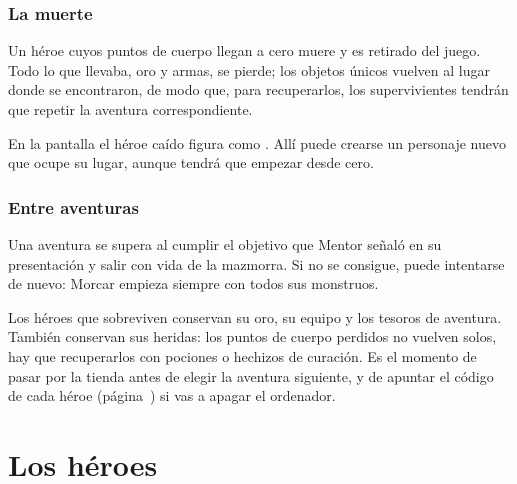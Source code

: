 \subsection{La muerte}

Un héroe cuyos puntos de cuerpo llegan a cero muere y es retirado del
juego. Todo lo que llevaba, oro y armas, se pierde; los objetos únicos
vuelven al lugar donde se encontraron, de modo que, para recuperarlos, los
supervivientes tendrán que repetir la aventura correspondiente.

En la pantalla  el héroe caído figura como
. Allí puede crearse un personaje nuevo que ocupe su lugar,
aunque tendrá que empezar desde cero.

\subsection{Entre aventuras}

Una aventura se supera al cumplir el objetivo que Mentor señaló en su
presentación y salir con vida de la mazmorra. Si no se consigue, puede
intentarse de nuevo: Morcar empieza siempre con todos sus monstruos.

Los héroes que sobreviven conservan su oro, su equipo y los tesoros de
aventura. También conservan sus heridas: los puntos de cuerpo perdidos no
vuelven solos, hay que recuperarlos con pociones o hechizos de curación. Es
el momento de pasar por la tienda antes de elegir la aventura siguiente, y
de apuntar el código de cada héroe (página~\pageref{sec:codigos}) si vas a
apagar el ordenador.

\chapter{Los héroes}



